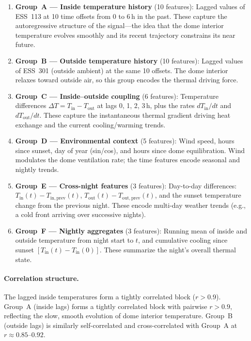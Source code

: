 \documentclass[11pt]{article}
\begin{document}
\begin{enumerate}
  \item \textbf{Group~A --- Inside temperature history} (10 features):
    Lagged values of ESS~113 at 10 time offsets from 0 to 6\,h in the past.
    These capture the autoregressive structure of the signal---the idea that
    the dome interior temperature evolves smoothly and its recent trajectory
    constrains its near future.

  \item \textbf{Group~B --- Outside temperature history} (10 features):
    Lagged values of ESS~301 (outside ambient) at the same 10 offsets.
    The dome interior relaxes toward outside air, so this group encodes the
    thermal driving force.

  \item \textbf{Group~C --- Inside--outside coupling} (6 features):
    Temperature differences $\Delta T = T_\mathrm{in} - T_\mathrm{out}$ at
    lags 0, 1, 2, 3\,h, plus the rates $dT_\mathrm{in}/dt$ and
    $dT_\mathrm{out}/dt$.  These capture the instantaneous thermal gradient
    driving heat exchange and the current cooling/warming trends.

  \item \textbf{Group~D --- Environmental context} (5 features):
    Wind speed, hours since sunset, day of year (sin/cos), and hours since
    dome equilibration.  Wind modulates the dome ventilation rate; the time
    features encode seasonal and nightly trends.

  \item \textbf{Group~E --- Cross-night features} (3 features):
    Day-to-day differences: $T_\mathrm{in}(t) - T_\mathrm{in,prev}(t)$,
    $T_\mathrm{out}(t) - T_\mathrm{out,prev}(t)$, and the sunset temperature
    change from the previous night.  These encode multi-day weather trends
    (e.g., a cold front arriving over successive nights).

  \item \textbf{Group~F --- Nightly aggregates} (3 features):
    Running mean of inside and outside temperature from night start to $t$,
    and cumulative cooling since sunset $[T_\mathrm{in}(t) - T_\mathrm{in}(0)]$.
    These summarize the night's overall thermal state.
\end{enumerate}

\paragraph{Correlation structure.}
The lagged inside temperatures form a tightly correlated block ($r > 0.9$).
Group~A (inside lags) forms a tightly correlated block with pairwise
$r > 0.9$, reflecting the slow, smooth evolution of dome interior temperature.
Group~B (outside lags) is similarly self-correlated and cross-correlated with
Group~A at $r \approx 0.85$--$0.92$.
\end{document}
